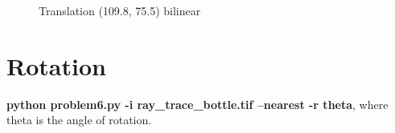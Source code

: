 \begin{figure}[!htb]\centering
    \begin{minipage}{0.6\textwidth}
    \caption{\small{Translation (109.8, 75.5) bilinear}}
    \end{minipage}
\end{figure}


\pagebreak

\section{Rotation}

\textbf{python problem6.py -i ray\_trace\_bottle.tif --nearest -r theta}, where theta is the angle of rotation.

